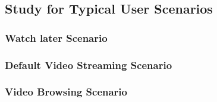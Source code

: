 \subsection{ Study for Typical User Scenarios}\label{sec:application:qoe_user_behaviour:typical_user_scenarios}
\subsubsection*{Watch later Scenario}\label{sec:application:qoe_user_behaviour:typical_user_scenarios:watch_later}
\subsubsection*{Default Video Streaming Scenario}\label{sec:application:qoe_user_behaviour:typical_user_scenarios:default}
\subsubsection*{Video Browsing Scenario}\label{sec:application:qoe_user_behaviour:typical_user_scenarios:browsing}
